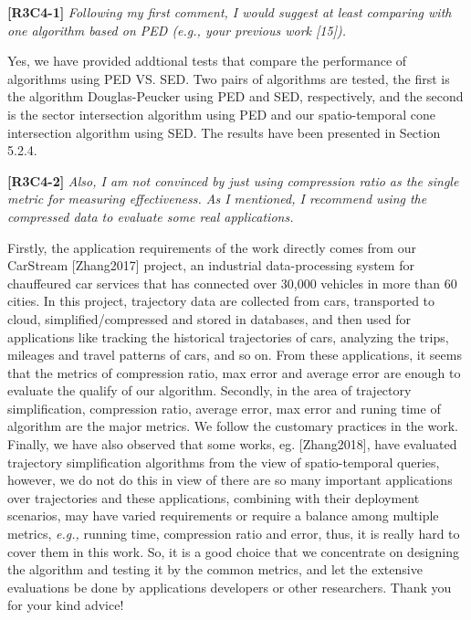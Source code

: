 \documentclass{letter}
\newcommand{\eg}{\emph{e.g.,}\xspace}
\begin{document}
\textbf{[R3C4-1]} \emph{Following my first comment, I would suggest at least comparing with one algorithm based on PED (e.g., your previous work [15]). }

Yes, we have provided addtional tests that compare the performance of algorithms using PED VS. SED. Two pairs of algorithms are tested, the first is the algorithm Douglas-Peucker using PED and SED, respectively, and the second is the sector intersection algorithm using PED and our spatio-temporal cone intersection algorithm using SED. %
The results have been presented in Section 5.2.4.


\textbf{[R3C4-2]} \emph{Also, I am not convinced by just using compression ratio as the single metric for measuring effectiveness. As I mentioned, I recommend using the compressed data to evaluate some real applications.}

Firstly, the application requirements of the work directly comes from our CarStream [Zhang2017] project, an industrial data-processing system for chauffeured car services that has connected over 30,000 vehicles in more than 60 cities. In this project, trajectory data are collected from cars, transported to cloud, simplified/compressed and stored in databases, and then used for applications like tracking the historical trajectories of cars, analyzing the trips, mileages and travel patterns of cars, and so on. From these applications, it seems that the metrics of compression ratio, max error and average error are enough to evaluate the qualify of our algorithm. 
%
Secondly, in the area of trajectory simplification, compression ratio, average error, max error and runing time of algorithm are the major metrics. We follow the customary practices in the work. 
%
Finally, we have also observed that some {works}, eg. [Zhang2018], have evaluated trajectory simplification algorithms from the view of spatio-temporal queries, however, we do not do this in view of there are so many important applications over trajectories and these applications, combining with their deployment scenarios, may have varied requirements or require a balance among multiple metrics, \eg running time, compression ratio and error, thus, it is really hard to cover them in this work. 
%
So, it is a good choice that we concentrate on designing the algorithm and testing it by the common metrics, and let the extensive evaluations be done by applications developers or other researchers. Thank you for your kind advice!
\end{document}
